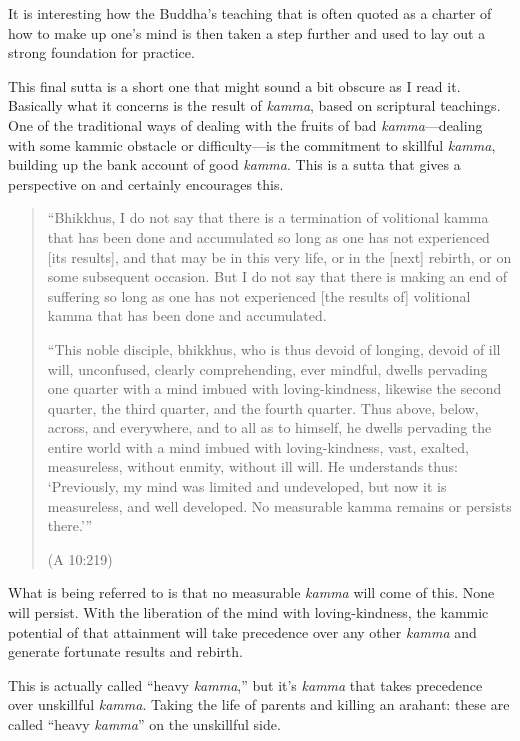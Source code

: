 It is interesting how the Buddha’s teaching that is often quoted as a
charter of how to make up one’s mind is then taken a step further and
used to lay out a strong foundation for practice.

This final sutta is a short one that might sound a bit obscure as I read
it. Basically what it concerns is the result of \emph{kamma}, based on
scriptural teachings. One of the traditional ways of dealing with the
fruits of bad \emph{kamma}—dealing with some kammic obstacle or
difficulty—is the commitment to skillful \emph{kamma}, building up the
bank account of good \emph{kamma}. This is a sutta that gives a
perspective on and certainly encourages this.

\begin{quotation}
“Bhikkhus, I do not say that there is a termination of volitional kamma
that has been done and accumulated so long as one has not experienced
{[}its results{]}, and that may be in this very life, or in the
{[}next{]} rebirth, or on some subsequent occasion. But I do not say
that there is making an end of suffering so long as one has not
experienced {[}the results of{]} volitional kamma that has been done and
accumulated.

“This noble disciple, bhikkhus, who is thus devoid of longing, devoid of
ill will, unconfused, clearly comprehending, ever mindful, dwells
pervading one quarter with a mind imbued with loving-kindness, likewise
the second quarter, the third quarter, and the fourth quarter. Thus
above, below, across, and everywhere, and to all as to himself, he
dwells pervading the entire world with a mind imbued with
loving-kindness, vast, exalted, measureless, without enmity, without ill
will. He understands thus: ‘Previously, my mind was limited and
undeveloped, but now it is measureless, and well developed. No
measurable kamma remains or persists there.’”

\hspace*{\fill}(A 10:219)
\end{quotation}

What is being referred to is that no measurable \emph{kamma} will come
of this. None will persist. With the liberation of the mind with
loving-kindness, the kammic potential of that attainment will take
precedence over any other \emph{kamma} and generate fortunate results
and rebirth.

This is actually called “heavy \emph{kamma},” but it’s \emph{kamma} that
takes precedence over unskillful \emph{kamma}. Taking the life of
parents and killing an arahant: these are called “heavy \emph{kamma}” on
the unskillful side.

